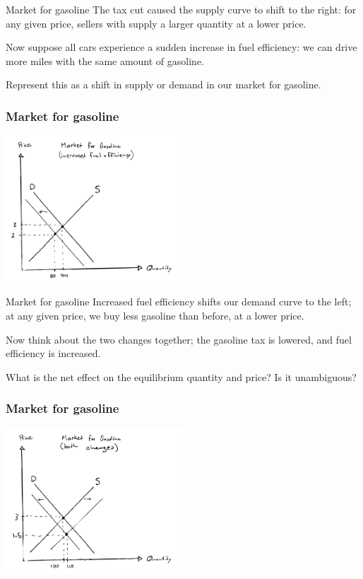 \documentclass[aspectratio=169]{beamer}
\begin{document}
\begin{frame}{Market for gasoline}
    The tax cut caused the supply curve to shift to the right: for any given price, sellers with supply a larger quantity at a lower price.

    \medskip

    Now suppose all cars experience a sudden increase in fuel efficiency: we can drive more miles with the same amount of gasoline.

    \medskip

    Represent this as a shift in supply or demand in our market for gasoline.
\end{frame}

\begin{frame}
    \frametitle{Market for gasoline}
    \centering
    \includegraphics[width = 0.5\textwidth,keepaspectratio]{increase_efficiency.png}
\end{frame}

\begin{frame}{Market for gasoline}
    Increased fuel efficiency shifts our demand curve to the left; at any given price, we buy less gasoline than before, at a lower price.

    \medskip

    Now think about the two changes together; the gasoline tax is lowered, and fuel efficiency is increased. 
    
    \medskip

    What is the net effect on the equilibrium quantity and price? Is it unambiguous?
\end{frame}

\begin{frame}
    \frametitle{Market for gasoline}
    \centering
    \includegraphics[width = 0.5\textwidth,keepaspectratio]{both_changes_1a.png}
\end{frame}
\end{document}
